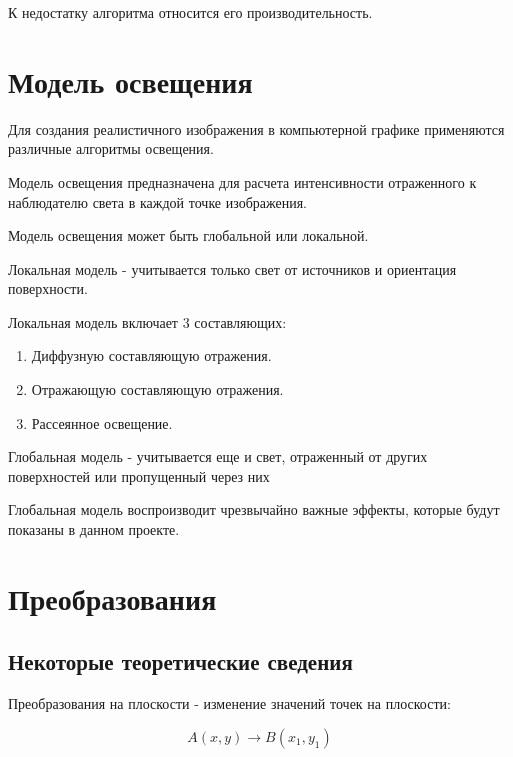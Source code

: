 К недостатку алгоритма относится его производительность.

\section {Модель освещения}

Для создания реалистичного изображения в компьютерной графике применяются различные алгоритмы освещения.

Модель освещения предназначена для расчета интенсивности
отраженного к наблюдателю света в каждой точке изображения.

Модель освещения может быть глобальной или локальной.

Локальная модель - учитывается только свет от источников и ориентация поверхности.

Локальная модель включает 3 составляющих:

\begin{enumerate}
	\item Диффузную составляющую отражения.
	\item Отражающую составляющую отражения.
	\item Рассеянное освещение.
\end{enumerate}

Глобальная модель - учитывается еще и свет, отраженный от других поверхностей или пропущенный через них

Глобальная модель воспроизводит чрезвычайно важные эффекты, которые будут показаны в данном проекте.


\section {Преобразования}

\subsection {Некоторые теоретические сведения}

Преобразования на плоскости - изменение значений точек на плоскости:

\begin{equation}
	A(x,y)\rightarrow B(x_1,y_1)
\end{equation}

